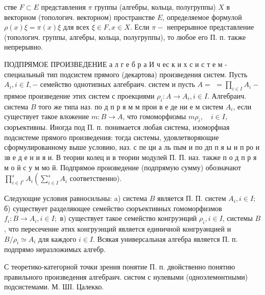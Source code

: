 \documentclass[10pt]{article}
\begin{document}
стве $F \subset E$ представления $\pi$ группы (алгебры, кольца, полугруппы) $X$ в векторном (топологич. векторном) пространстве $E$, определяемое формулой $\rho(x) \xi=\pi(x) \xi$ для всех $\xi \in F, x \in X$. Если $\pi-$ непрерывное представление (топологич. группы, алгебры, кольца, полугруппы), то любое его П. п. также непрерывно.



ПОДПРЯМОЕ ПРОИЗВЕДЕНИЕ а л г е б р а И ч ес к и х с и с т е м - специальный тип подсистем прямого (декартова) произведения систем. Пусть $A_{i}, i \in I,-$ семейство однотипных алгебраич. систем и пусть $A=$ $=\prod_{i \in I} A_{i}-$ прямое произведение этих систем с проекциями $\rho_{i}: A \rightarrow A_{i}, i \in I$. Алгебраич. система $B$ того же типа наз. по д п р я м м прои в е де ни е м систем $A_{i}$, если существует такое вложение $m: B \rightarrow A$, что гомоморфизмы $m \rho_{i}, \quad i \in I$, сюръективны. Иногда под П. п. понимается любая система, изоморфная подсистеме прямого произведения: тогда системы, удовлетворяющие сформулированному выше условию, наз. с пе ци а ль пым и по дп п я ы и п ро и зв е д е н и я и. В теории колец и в теории модулей П. П. наз. также п о д п р я м о й с у м мо й. Подпрямоө произведение (подпрямую сумму) обозначают $\prod_{i \in I^{s}}^{s} A_{i}\left(\sum_{i \in I}^{s} A_{i}\right.$ соответственно).



Следующие условия равносильны: a) система $B$ является П. П. систем $A_{i}, i \in I ;$ б) существует разделяющее семейство сюръективных гомоморфизмов $f_{i}: B \rightarrow A_{i}, i \in I ;$ в) существует такое семейство конгруэнций $\rho_{i}, i \in I$, системы $B$, что пересечение әтих конгруэнций является единичной конгруәнцией и $B / \rho_{i} \simeq A_{i}$ для каждого $i \in I$. Всякая универсальная алгебра является П. п. подпрямо неразложимых алгебр.



С теоретико-категорной точки зрения понятие П. п. двойственно понятию правильного произведения алгебраич. систөм с нулевыми (одноэлемөнтными) подсистемами. М. ШІ. Цалекко.
\end{document}
